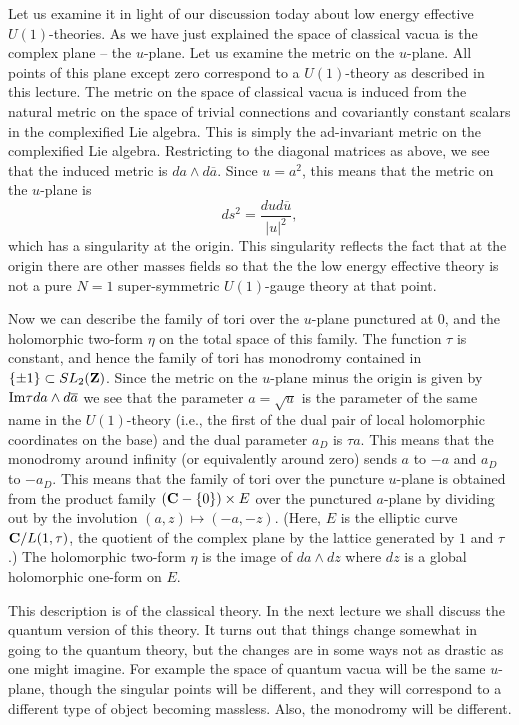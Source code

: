 \documentclass[10pt]{article}
\begin{document}
Let us examine it in light of our discussion today about low energy
effective $U(1)$-theories.  
As we have just explained the space of classical vacua is the complex
plane -- the $u$-plane.
Let us examine the metric on the $u$-plane. 
All points of this plane except zero correspond to a $U(1)$-theory as
described in this lecture.
The metric on the space of classical vacua is induced from the natural
metric on the 
space of trivial connections and covariantly constant scalars in the
complexified Lie algebra.  This is simply  the ad-invariant metric on the
complexified Lie algebra. Restricting to the diagonal matrices as
above, we see that the induced metric is $da\wedge d\overline{a}$. 
Since $u=a^2$, this means that the metric on the $u$-plane is
$$ds^2=\frac{du d\overline{u}}{|u|^2},$$
which has a singularity at the origin.  This singularity reflects the
fact that at the origin there are other masses fields so that the
the low energy effective theory is not a pure $N=1$ super-symmetric
$U(1)$-gauge theory at that point.

Now we can describe the family of tori over the $u$-plane punctured at
$0$, and the holomorphic two-form
$\eta$ on the total space of this family.
The function $\tau$ is constant, and hence the family of tori has
monodromy contained in $\{\pm 1\}\subset SL_2({\bf Z})$. Since the
metric on the $u$-plane minus the origin is given by ${\rm Im}\tau
da\wedge d\overline{a}$ we see that the parameter $a=\sqrt{u}$ is the
parameter of the same name in the $U(1)$-theory (i.e., the first of
the dual pair of local holomorphic coordinates on the base) and the
dual parameter $a_D$ is $\tau a$. This means that the monodromy around
infinity (or equivalently around zero) sends $a$ to $-a$ and $a_D$ to
$-a_D$. This means that the family of tori over the puncture
$u$-plane is obtained from the
product family $({\bf C}-\{0\})\times E$ over the punctured $a$-plane
by dividing out by the involution $(a,z)\mapsto (-a,-z)$. 
(Here, $E$ is the elliptic curve ${\bf C}/L(1,\tau)$, the quotient of
the complex plane by the lattice generated by $1$ and $\tau$.)
The holomorphic two-form $\eta$ is the image of $da\wedge dz$ where
$dz$ is a global holomorphic one-form on $E$.


This description is of the classical theory.  In the next lecture we
shall discuss the quantum version of this theory. It turns out that
things change somewhat in going to the quantum theory, but the
changes are in some ways not as drastic as one might imagine. For 
example the space 
of quantum vacua will be the same $u$-plane, though the singular
points will be different, and they will correspond to a different
type of object becoming massless.
Also, the monodromy will be different.
\end{document}
